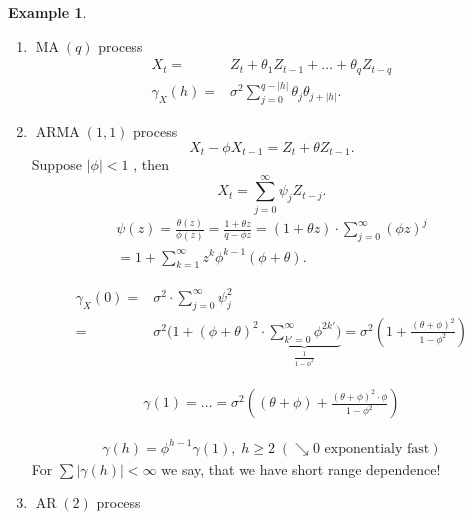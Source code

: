 \documentclass[12pt,a4paper, notitlepage]{book}
\theoremstyle{definition} %
\newtheorem{example}[definition]{Example}
\theoremstyle{plain} %
\DeclareMathOperator{\Arma}{ARMA}
\DeclareMathOperator{\Ar}{AR}
\DeclareMathOperator{\Ma}{MA}
\begin{document}
\begin{example}
\begin{enumerate}[alph]
\item
$ \Ma(q) $ process 
\begin{align*} 
 X_t = & Z_t + \theta_1  Z_{t-1} + \ldots + \theta_q Z_{t-q} \\
\gamma _X(h) = & \sigma ^2 \sum _{j=0} ^{q- |h| } \theta_j \theta_{j+ |h| } . 
\end{align*}


\item $ \Arma(1,1) $ process 
\[ X_t - \phi X_{t-1} = Z_t + \theta Z_{t-1} . \]
Suppose $ | \phi | < 1 $ , then 
\[ X_t = \sum_{j=0} ^{\infty} \psi _j Z_{t-j} . \]
\begin{align*}
 \psi (z) = \frac{ \theta(z) }{ \phi(z)} = \frac{ 1 + \theta z}{ q - \phi z} = ( 1 + \theta z) \cdot \sum _{j=0} ^{\infty} ( \phi z) ^j \\
= 1 + \sum _{k=1} ^{\infty} z^k \phi ^{k-1} (\phi + \theta) . 
\end{align*}

\begin{align*} 
\gamma _X(0) = & \sigma ^2 \cdot \sum _{j=0} ^ {\infty} \psi _j ^2 \\
= & \sigma ^2  (1 + ( \phi + \theta ) ^2 \cdot \underbrace{ \sum_{k'=0} ^{\infty} \phi ^{2k'} \big) } _{ \frac{1}{1- \phi ^2} } = 
\sigma ^2 \left( 1 + \frac{ ( \theta + \phi)^2}{1 - \phi ^2 } \right) 
\end{align*}

\begin{align*} 
\gamma(1) = \ldots = \sigma ^2 \left( (\theta + \phi ) + \frac{ ( \theta + \phi) ^2 \cdot \phi }{ 1 - \phi ^2 } \right) 
\end{align*}

\begin{align*}
\gamma(h) = \phi ^{h-1} \gamma(1) , \; h \geq 2  \; ( \searrow 0 \text{ exponentialy fast}) 
\end{align*}
For $ \sum | \gamma (h) | < \infty $ we say, that we have short range dependence!

\item $ \Ar(2) $ process 


\end{enumerate}
\end{example}
\end{document}
